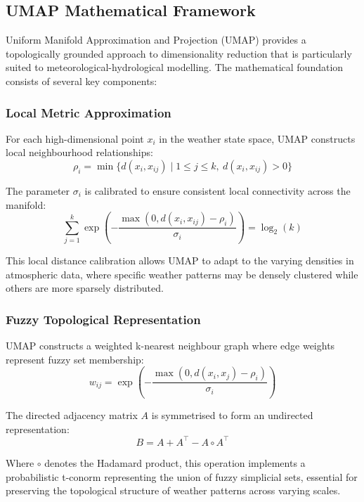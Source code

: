 \documentclass{article}
\begin{document}
\subsection{UMAP Mathematical Framework}
Uniform Manifold Approximation and Projection (UMAP) provides a topologically grounded approach to dimensionality reduction that is particularly suited to meteorological-hydrological modelling. The mathematical foundation consists of several key components:

\subsubsection{Local Metric Approximation}
For each high-dimensional point $x_i$ in the weather state space, UMAP constructs local neighbourhood relationships:
\begin{equation}
\rho_i = \min \{ d(x_i, x_{ij}) \mid 1 \leq j \leq k, \ d(x_i, x_{ij}) > 0 \}
\end{equation}

The parameter $\sigma_i$ is calibrated to ensure consistent local connectivity across the manifold:
\begin{equation}
\sum_{j=1}^k \exp\left(-\frac{\max(0, d(x_i, x_{ij}) - \rho_i)}{\sigma_i}\right) = \log_2(k)
\end{equation}

This local distance calibration allows UMAP to adapt to the varying densities in atmospheric data, where specific weather patterns may be densely clustered while others are more sparsely distributed.

\subsubsection{Fuzzy Topological Representation}
UMAP constructs a weighted k-nearest neighbour graph where edge weights represent fuzzy set membership:
\begin{equation}
w_{ij} = \exp\left(-\frac{\max(0, d(x_i, x_j) - \rho_i)}{\sigma_i}\right)
\end{equation}

The directed adjacency matrix $A$ is symmetrised to form an undirected representation:
\begin{equation}
B = A + A^\top - A \circ A^\top
\end{equation}

Where $\circ$ denotes the Hadamard product, this operation implements a probabilistic t-conorm representing the union of fuzzy simplicial sets, essential for preserving the topological structure of weather patterns across varying scales.
\end{document}
